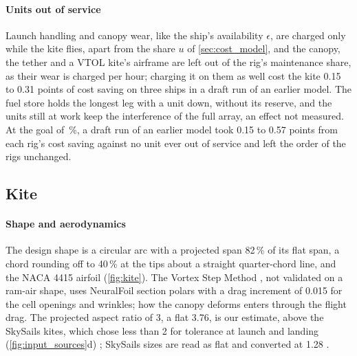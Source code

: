 \paragraph{Units out of service} Launch handling and canopy wear, like the ship's availability $\epsilon$, are charged only while the kite flies, apart from the share $u$ of \cref{sec:cost_model}, and the canopy, the tether and a VTOL kite's airframe are left out of the rig's maintenance share, as their wear is charged per hour; charging it on them as well cost the kite 0.15 to 0.31 points of cost saving on three ships in a draft run of an earlier model. The fuel store holds the longest leg with a unit down, without its reserve, and the units still at work keep the interference of the full array, an effect not measured. At the goal of \,\%, a draft run of an earlier model took 0.15 to 0.57 points from each rig's cost saving against no unit ever out of service and left the order of the rigs unchanged.

\subsection{Kite}
\label{sec:det_kite}

\paragraph{Shape and aerodynamics}\label{app:kite_aspect} The design shape is a circular arc with a projected span 82\,\% of its flat span, a chord rounding off to 40\,\% at the tips about a straight quarter-chord line, and the NACA 4415 airfoil (\cref{fig:kite}). The Vortex Step Method \citep{cayon2023}, not validated on a ram-air shape, uses NeuralFoil section polars \citep{sharpe2025} with a drag increment of 0.015 for the cell openings and wrinkles; how the canopy deforms enters through the flight drag. The projected aspect ratio of 3, a flat 3.76, is our estimate, above the SkySails kites, which chose less than 2 for tolerance at launch and landing (\cref{fig:input_sources}d) \citep{paulig2013,folkersma2020}; SkySails sizes are read as flat and converted at 1.28 \citep{folkersma2020}. 


